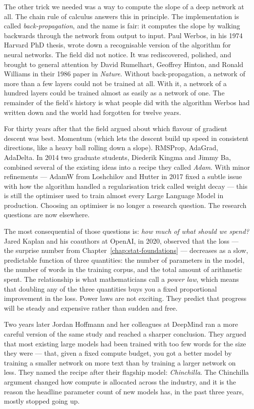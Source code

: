 The other trick we needed was a way to compute the slope of a
deep network at all. The chain rule of calculus answers this in
principle. The implementation is called \emph{back-propagation},
and the name is fair: it computes the slope by walking backwards
through the network from output to input. Paul Werbos, in his
1974 Harvard PhD thesis, wrote down a recognisable version of
the algorithm for neural networks. The field did not notice. It
was rediscovered, polished, and brought to general attention by
David Rumelhart, Geoffrey Hinton, and Ronald Williams in their
1986 paper in \emph{Nature}. Without back-propagation, a network
of more than a few layers could not be trained at all. With it,
a network of a hundred layers could be trained almost as easily
as a network of one. The remainder of the field's history is
what people did with the algorithm Werbos had written down and
the world had forgotten for twelve years.

For thirty years after that the field argued about which
flavour of gradient descent was best. Momentum (which lets the
descent build up speed in consistent directions, like a heavy
ball rolling down a slope). RMSProp, AdaGrad, AdaDelta. In 2014
two graduate students, Diederik Kingma and Jimmy Ba, combined
several of the existing ideas into a recipe they called
\emph{Adam}. With minor refinements --- AdamW from Loshchilov
and Hutter in 2017 fixed a subtle issue with how the algorithm
handled a regularisation trick called weight decay --- this is
still the optimiser used to train almost every Large Language
Model in production. Choosing an optimiser is no longer a
research question. The research questions are now elsewhere.

The most consequential of those questions is: \emph{how much
of what should we spend?} Jared Kaplan and his coauthors at
OpenAI, in 2020, observed that the loss --- the surprise number
from Chapter~\ref{chap:stat-foundations} --- decreases as a slow, predictable function of
three quantities: the number of parameters in the model, the
number of words in the training corpus, and the total amount of
arithmetic spent. The relationship is what mathematicians call
a \emph{power law}, which means that doubling any of the three
quantities buys you a fixed proportional improvement in the
loss. Power laws are not exciting. They predict that progress
will be steady and expensive rather than sudden and free.

Two years later Jordan Hoffmann and her colleagues at DeepMind
ran a more careful version of the same study and reached a
sharper conclusion. They argued that most existing large
models had been trained with too few words for the size they
were --- that, given a fixed compute budget, you got a better
model by training a smaller network on more text than by
training a larger network on less. They named the recipe after
their flagship model: \emph{Chinchilla}. The Chinchilla
argument changed how compute is allocated across the industry,
and it is the reason the headline parameter count of new
models has, in the past three years, mostly stopped going up.

